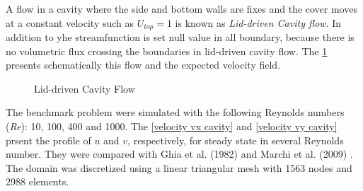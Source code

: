 A flow in a cavity where the side and bottom walls are fixes and 
the cover moves at a constant velocity such as \textit{$U_{top}=1$} 
is known as \textit {Lid-driven Cavity flow}.
In addition to 
yhe streamfunction is set null value in all boundary, 
because there is no volumetric flux crossing the boundaries 
in lid-driven cavity flow.
The \ref{cavity} presents schematically this flow and 
the expected velocity field.

\vspace{1cm}
\begin{figure}[H]
\begin{center}
\end{center}
\caption{Lid-driven Cavity Flow}
\label{cavity}
\end{figure}

\bigskip
The benchmark problem were simulated with the following 
Reynolds numbers (\textit{Re}): 10, 100, 400 and 1000.
The \ref{velocity vx cavity} and \ref{velocity vy cavity} 
prsent the profile of $u$ and $v$, respectively,
for steady state in several Reynolds number. 
They were compared with 
Ghia et al. (1982) \cite{ghia1982} and 
Marchi et al. (2009) \cite{marchi2009}. 
The domain was discretized using a linear triangular mesh 
with 1563 nodes and 2988 elements.

